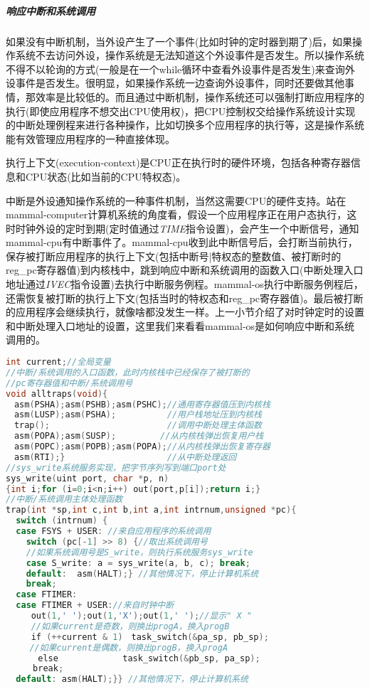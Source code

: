 \subparagraph{响应中断和系统调用}\label{dointr}

如果没有中断机制，当外设产生了一个事件(比如时钟的定时器到期了)后，如果操作系统不去访问外设，操作系统是无法知道这个外设事件是否发生。所以操作系统不得不以轮询的方式(一般是在一个while循环中查看外设事件是否发生)来查询外设事件是否发生。很明显，如果操作系统一边查询外设事件，同时还要做其他事情，那效率是比较低的。而且通过中断机制，操作系统还可以强制打断应用程序的执行(即使应用程序不想交出CPU使用权)，把CPU控制权交给操作系统设计实现的中断处理例程来进行各种操作，比如切换多个应用程序的执行等，这是操作系统能有效管理应用程序的一种直接体现。

\begin{note} 
执行上下文(execution-context)是CPU正在执行时的硬件环境，包括各种寄存器信息和CPU状态(比如当前的CPU特权态)。
\end{note} 

中断是外设通知操作系统的一种事件机制，当然这需要CPU的硬件支持。站在mammal-computer计算机系统的角度看，假设一个应用程序正在用户态执行，这时时钟外设的定时到期(定时值通过\textit{TIME}指令设置)，会产生一个中断信号，通知mammal-cpu有中断事件了。mammal-cpu收到此中断信号后，会打断当前执行，保存被打断应用程序的执行上下文(包括中断号|特权态的整数值、被打断时的reg\_pc寄存器值)到内核栈中，跳到响应中断和系统调用的函数入口(中断处理入口地址通过\textit{IVEC}指令设置)去执行中断服务例程。mammal-os执行中断服务例程后，还需恢复被打断的执行上下文(包括当时的特权态和reg\_pc寄存器值)。最后被打断的应用程序会继续执行，就像啥都没发生一样。上一小节介绍了对时钟定时的设置和中断处理入口地址的设置，这里我们来看看mammal-os是如何响应中断和系统调用的。

\begin{lstlisting}[language={C}]
int current;//全局变量
//中断/系统调用的入口函数，此时内核栈中已经保存了被打断的
//pc寄存器值和中断/系统调用号
void alltraps(void){
　asm(PSHA);asm(PSHB);asm(PSHC);//通用寄存器值压到内核栈
　asm(LUSP);asm(PSHA);          //用户栈地址压到内核栈
　trap();                       //调用中断处理主体函数
　asm(POPA);asm(SUSP); 　　　　 //从内核栈弹出恢复用户栈
　asm(POPC);asm(POPB);asm(POPA);//从内核栈弹出恢复寄存器
　asm(RTI);}                    //从中断处理返回
//sys_write系统服务实现，把字节序列写到端口port处
sys_write(uint port, char *p, n) 
{int i;for (i=0;i<n;i++) out(port,p[i]);return i;}
//中断/系统调用主体处理函数
trap(int *sp,int c,int b,int a,int intrnum,unsigned *pc){
  switch (intrnum) {
  case FSYS + USER: //来自应用程序的系统调用
    switch (pc[-1] >> 8) {//取出系统调用号
    //如果系统调用号是S_write，则执行系统服务sys_write
    case S_write: a = sys_write(a, b, c); break;
    default:  asm(HALT);} //其他情况下，停止计算机系统
    break;   
  case FTIMER:  
  case FTIMER + USER://来自时钟中断
　　　out(1,' ');out(1,'X');out(1,' ');//显示" X "
　　　//如果current是奇数，则换出progA，换入progB
　　　if (++current & 1)　task_switch(&pa_sp, pb_sp);
   　//如果current是偶数，则换出progB，换入progA
   　　else　 　　　　　　task_switch(&pb_sp, pa_sp);
  　　break;
  default: asm(HALT);}} //其他情况下，停止计算机系统
\end{lstlisting}

